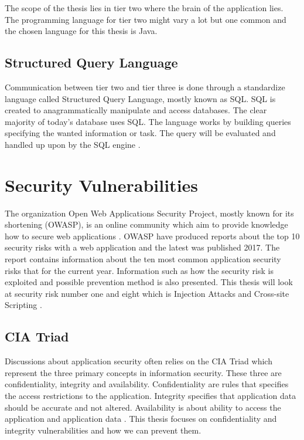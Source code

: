 The scope of the thesis lies in tier two where the brain of the application lies. The programming language for tier two might vary a lot but one common and the chosen language for this thesis is Java.  


\subsection{Structured Query Language}
Communication between tier two and tier three is done through a standardize language called Structured Query Language, mostly known as SQL. SQL is created to anagrammatically manipulate and access databases. The clear majority of today's database uses SQL. The language works by building queries specifying the wanted information or task. The query will be evaluated and handled up upon by the SQL engine \parencite{DarieCristian2003TPGt}.


\section{Security Vulnerabilities}
\label{SecurityVulnerabilities}
The organization Open Web Applications Security Project, mostly known for its shortening (OWASP), is an online community which aim to provide knowledge how to secure web applications \parencite{OpenWebApplicationSecurityProject}. OWASP have produced reports about the top 10 security risks with a web application and the latest was published 2017. The report contains information about the ten most common application security risks that for the current year. Information such as how the security risk is exploited and possible prevention method is also presented. This thesis will look at security risk number one and eight which is Injection Attacks and Cross-site Scripting \parencite{OWASP2017}.


\subsection{CIA Triad}
Discussions about application security often relies on the CIA Triad which represent the three primary concepts in information security. These three are confidentiality, integrity and availability. Confidentiality are rules that specifies the access restrictions to the application. Integrity specifies that application data should be accurate and not altered. Availability is about ability to access the application and application data \parencite{2014C1-W}. This thesis focuses on confidentiality and integrity vulnerabilities and how we can prevent them.

